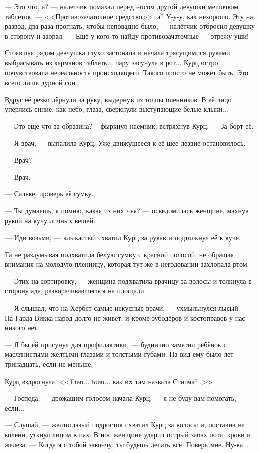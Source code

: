 --- Это что, а? --- налетчик помахал перед носом другой девушки мешочком таблеток.
--- <<Противозачаточное средство>>, а?
У-у-у, как нехорошо.
Эту на развод, два раза прогнать, чтобы неповадно было, --- налётчик отбросил девушку в сторону и заорал:
--- Ещё у кого-то найду противозачаточные --- отрежу уши!

Стоявшая рядом девчушка глухо застонала и начала трясущимися руками выбрасывать из карманов таблетки, пару засунула в рот...
Курц остро почувствовала нереальность происходящего.
Такого просто не может быть.
Это всего лишь дурной сон...

Вдруг её резко дёрнули за руку, выдернув из толпы пленников.
В её лицо упёрлись синие, как небо, глаза, сверкнули выступающие белые клыки...

--- Это еще что за образина? -- фыркнул наёмник, встряхнув Курц.
--- За борт её.

--- Я врач, --- выпалила Курц.
Уже движущееся к её шее лезвие остановилось.

--- Врач?

--- Врач.

--- Сальке, проверь её сумку.

--- Ты думаешь, я помню, какая из них чья? --- осведомилась женщина, махнув рукой на кучу личных вещей.

--- Иди возьми, --- клыкастый схватил Курц за рукав и подтолкнул её к куче.

Та не раздумывая подхватила белую сумку с красной полосой, не обращая внимания на молодую пленницу, которая тут же в негодовании захлопала ртом.

--- Этих на сортировку, --- женщина подхватила врачицу за волосы и толкнула в сторону ада, разворачивавшегося на площади.

--- Я слышал, что на Хербст самые искусные врачи, --- ухмыльнулся лысый.
--- На Гарда Викка народ долго не живёт, и кроме зубодёров и костоправов у нас никого нет.

--- Я бы ей присунул для профилактики, --- буднично заметил ребёнок с маслянистыми жёлтыми глазами и толстыми губами.
На вид ему было лет тринадцать, если не меньше.

Курц вздрогнула.
<<Fien... foen... как их там назвала Стигма?..>>

--- Господа, --- дрожащим голосом начала Курц, --- я не буду вам помогать, если...

--- Слушай, --- желтоглазый подросток схватил Курц за волосы и, поставив на колени, уткнул лицом в пах.
В нос женщине ударил острый запах пота, крови и железа.
--- Когда я с тобой закончу, ты будешь делать всё.
Поверь мне.
Ну-ка...

